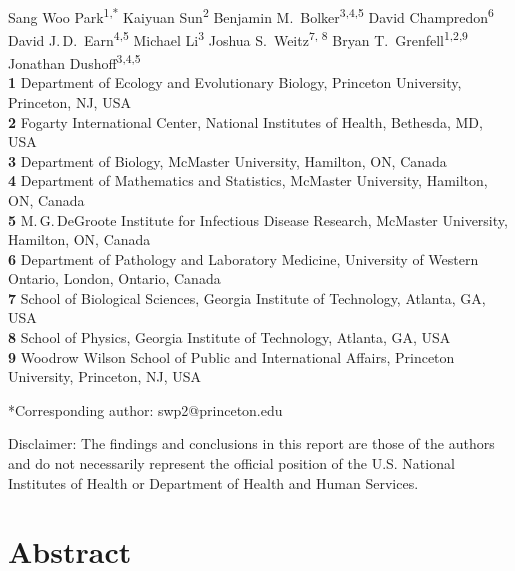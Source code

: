 \documentclass[12pt]{article}
\date{\today}
\begin{document}
\begin{flushleft}{
	\Large
	\textbf{}
}
\newline
\\
Sang Woo Park\textsuperscript{1,*}
Kaiyuan Sun\textsuperscript{2}
Benjamin M.\ Bolker\textsuperscript{3,4,5}
David Champredon\textsuperscript{6}
David J.\,D.\ Earn\textsuperscript{4,5}
Michael Li\textsuperscript{3}
Joshua S.\ Weitz\textsuperscript{7, 8}
Bryan T.\ Grenfell\textsuperscript{1,2,9}
Jonathan Dushoff\textsuperscript{3,4,5}
\\
\bigskip
\textbf{1} Department of Ecology and Evolutionary Biology, Princeton University, Princeton, NJ, USA
\\
\textbf{2} Fogarty International Center, National Institutes of Health, Bethesda, MD, USA
\\
\textbf{3} Department of Biology, McMaster University, Hamilton, ON, Canada
\\
\textbf{4} Department of Mathematics and Statistics, McMaster University, Hamilton, ON, Canada
\\
\textbf{5} M.\,G.\,DeGroote Institute for Infectious Disease Research, McMaster University, Hamilton, ON, Canada
\\
\textbf{6} Department of Pathology and Laboratory Medicine, University of Western Ontario, London, Ontario, Canada
\\
\textbf{7} School of Biological Sciences, Georgia Institute of Technology, Atlanta, GA, USA
\\
\textbf{8} School of Physics, Georgia Institute of Technology, Atlanta, GA, USA
\\
\textbf{9} Woodrow Wilson School of Public and International Affairs, Princeton University, Princeton, NJ, USA
\\
\bigskip

*Corresponding author: swp2@princeton.edu
\bigskip

Disclaimer: The findings and conclusions in this report are those of the authors and do not necessarily represent the official position of the U.S. National Institutes of Health or Department of Health and Human Services.
\end{flushleft}

\pagebreak

\section*{Abstract}
\end{document}
